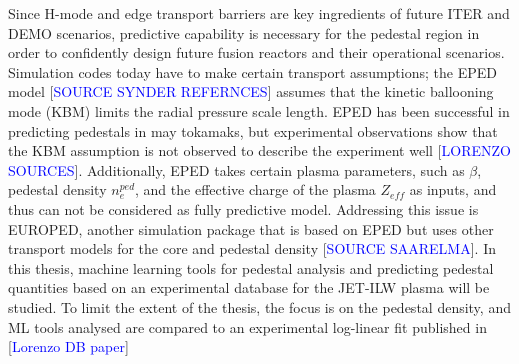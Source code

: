 \documentclass[a4paper, twoside, final, 12pt]{article}
\begin{document}
Since H-mode and edge transport barriers are key ingredients of future ITER and DEMO scenarios, predictive capability is necessary for the pedestal region in order to confidently design future fusion reactors and their operational scenarios.
Simulation codes today have to make certain transport assumptions; the EPED model [\textcolor{blue}{SOURCE SYNDER REFERNCES}] assumes that the kinetic ballooning mode (KBM) limits the radial pressure scale length.
EPED has been successful in predicting pedestals in may tokamaks, but experimental observations show that the KBM assumption is not observed to describe the experiment well [\textcolor{blue}{LORENZO SOURCES}].
Additionally, EPED takes certain plasma parameters, such as $\beta$, pedestal density $n_e^{ped}$, and the effective charge of the plasma $Z_{eff}$ as inputs, and thus can not be considered as fully predictive model.
Addressing this issue is EUROPED, another simulation package that is based on EPED but uses other transport models for the core and pedestal density [\textcolor{blue}{SOURCE SAARELMA}].
In this thesis, machine learning tools for pedestal analysis and predicting pedestal quantities based on an experimental database for the JET-ILW plasma will be studied.
To limit the extent of the thesis, the focus is on the pedestal density, and ML tools analysed are compared to an experimental log-linear fit published in [\textcolor{blue}{Lorenzo DB paper}]
\end{document}
